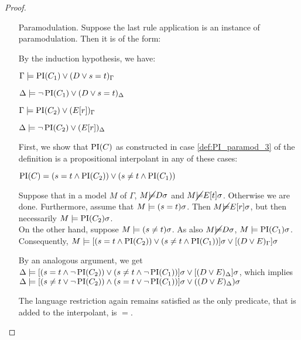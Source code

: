 \begin{proof}
\begin{itemize}
		\item[Paramodulation.]	
			Suppose the last rule application is an instance of paramodulation. Then it is of the form:
			\begin{prooftree}
			\end{prooftree}

			By the induction hypothesis, we have:

			$\Gamma \models \operatorname{PI}(C_1) \lor (D\lor s=t)_\Gamma$

			$\Delta \models \lnot \operatorname{PI}(C_1) \lor (D\lor s=t)_\Delta$

			$\Gamma \models \operatorname{PI}(C_2) \lor (E[r])_\Gamma$

			$\Delta \models \lnot \operatorname{PI}(C_2) \lor (E[r])_\Delta$

			First, we show that $\operatorname{PI}(C)$ as constructed in case \ref{def:PI_paramod_3} of the definition is a propositional interpolant in any of these cases:

			$\operatorname{PI}(C) = (s=t \land \operatorname{PI}(C_2)) \lor (s\neq t \land \operatorname{PI}(C_1)) $

			Suppose that in a model $M$ of $\Gamma$, $M \cancel {\models} D\sigma$ and $M \cancel {\models} E[t]\sigma$. Otherwise we are done.
			Furthermore, assume that $M \models (s=t)\sigma$. Then $M \cancel {\models} E[r]\sigma$, but then necessarily $M \models \operatorname{PI}(C_2)\sigma$. \\
			On the other hand, suppose $M \models (s\neq t)\sigma$. As also $M \cancel {\models} D\sigma$, $M \models \operatorname{PI}(C_1)\sigma$.
			Consequently, $M \models [(s=t \land \operatorname{PI}(C_2)) \lor (s\neq t \land \operatorname{PI}(C_1))]\sigma \lor [(D \lor E)_\Gamma]\sigma$

			By an analogous argument, we get $\Delta \models [(s=t \land \lnot \operatorname{PI}(C_2)) \lor (s\neq t \land \lnot \operatorname{PI}(C_1))]\sigma \lor [(D \lor E)_\Delta]\sigma$,
			which implies
			$\Delta \models [( s\neq t \lor \lnot \operatorname{PI}(C_2)) \land (s = t \lor \lnot \operatorname{PI}(C_1))]\sigma \lor ((D \lor E)_\Delta)\sigma $


			The language restriction again remains satisfied as the only predicate, that is added to the interpolant, is $=$.


\end{itemize}
\end{proof}
